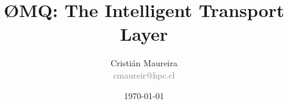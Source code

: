 \documentclass{beamer}
\author[C. Maureira]{\large Cristián Maureira\\\normalsize \textcolor{gray}{cmaureir@hpc.cl}}
\title[ØMQ]{\huge ØMQ: The Intelligent Transport Layer}
\institute[UTFSM]{Universidad Técnica Federico Santa María}
\date{\today}
\begin{document}
\begin{frame}[t,plain]
\titlepage
\end{frame}



\begin{frame}[t,plain]
\titlepage
\end{frame}
\end{document}
